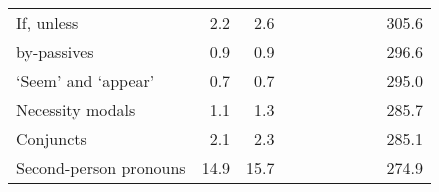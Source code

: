 \begin{table}[!t]
\begin{tabular*}{\linewidth}{@{\extracolsep{\fill}}lrrrrrrrrr}
If, unless & 2.2 & 2.6 & {\cellcolor[HTML]{FDDBC7}{\textcolor[HTML]{000000}{78\%}}} & {\cellcolor[HTML]{F4A582}{\textcolor[HTML]{000000}{60\%}}} & {\cellcolor[HTML]{F4A582}{\textcolor[HTML]{000000}{58\%}}} & {\cellcolor[HTML]{F4A582}{\textcolor[HTML]{000000}{62\%}}} & {\cellcolor[HTML]{D1E5F0}{\textcolor[HTML]{000000}{117\%}}} & {\cellcolor[HTML]{F7F7F7}{\textcolor[HTML]{000000}{111\%}}} & 305.6 \\ 
by-passives & 0.9 & 0.9 & {\cellcolor[HTML]{F4A582}{\textcolor[HTML]{000000}{56\%}}} & {\cellcolor[HTML]{F4A582}{\textcolor[HTML]{000000}{63\%}}} & {\cellcolor[HTML]{D1E5F0}{\textcolor[HTML]{000000}{118\%}}} & {\cellcolor[HTML]{F7F7F7}{\textcolor[HTML]{000000}{107\%}}} & {\cellcolor[HTML]{D1E5F0}{\textcolor[HTML]{000000}{113\%}}} & {\cellcolor[HTML]{F7F7F7}{\textcolor[HTML]{000000}{103\%}}} & 296.6 \\ 
‘Seem’ and ‘appear’ & 0.7 & 0.7 & {\cellcolor[HTML]{D1E5F0}{\textcolor[HTML]{000000}{131\%}}} & {\cellcolor[HTML]{92C5DE}{\textcolor[HTML]{000000}{179\%}}} & {\cellcolor[HTML]{92C5DE}{\textcolor[HTML]{000000}{140\%}}} & {\cellcolor[HTML]{D1E5F0}{\textcolor[HTML]{000000}{128\%}}} & {\cellcolor[HTML]{F7F7F7}{\textcolor[HTML]{000000}{99\%}}} & {\cellcolor[HTML]{F7F7F7}{\textcolor[HTML]{000000}{105\%}}} & 295.0 \\ 
Necessity modals & 1.1 & 1.3 & {\cellcolor[HTML]{F7F7F7}{\textcolor[HTML]{000000}{105\%}}} & {\cellcolor[HTML]{FDDBC7}{\textcolor[HTML]{000000}{78\%}}} & {\cellcolor[HTML]{F4A582}{\textcolor[HTML]{000000}{51\%}}} & {\cellcolor[HTML]{F4A582}{\textcolor[HTML]{000000}{54\%}}} & {\cellcolor[HTML]{92C5DE}{\textcolor[HTML]{000000}{143\%}}} & {\cellcolor[HTML]{92C5DE}{\textcolor[HTML]{000000}{137\%}}} & 285.7 \\ 
Conjuncts & 2.1 & 2.3 & {\cellcolor[HTML]{F7F7F7}{\textcolor[HTML]{000000}{110\%}}} & {\cellcolor[HTML]{F7F7F7}{\textcolor[HTML]{000000}{96\%}}} & {\cellcolor[HTML]{F7F7F7}{\textcolor[HTML]{000000}{97\%}}} & {\cellcolor[HTML]{D1E5F0}{\textcolor[HTML]{000000}{116\%}}} & {\cellcolor[HTML]{F7F7F7}{\textcolor[HTML]{000000}{99\%}}} & {\cellcolor[HTML]{F7F7F7}{\textcolor[HTML]{000000}{104\%}}} & 285.1 \\ 
Second-person pronouns & 14.9 & 15.7 & {\cellcolor[HTML]{F4A582}{\textcolor[HTML]{000000}{63\%}}} & {\cellcolor[HTML]{F4A582}{\textcolor[HTML]{000000}{52\%}}} & {\cellcolor[HTML]{FDDBC7}{\textcolor[HTML]{000000}{77\%}}} & {\cellcolor[HTML]{FDDBC7}{\textcolor[HTML]{000000}{81\%}}} & {\cellcolor[HTML]{D1E5F0}{\textcolor[HTML]{000000}{118\%}}} & {\cellcolor[HTML]{F7F7F7}{\textcolor[HTML]{000000}{110\%}}} & 274.9 \\ 

\end{tabular*}
\end{table}
